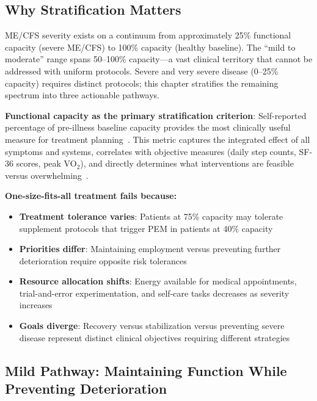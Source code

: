 \subsection{Why Stratification Matters}

ME/CFS severity exists on a continuum from approximately 25\% functional capacity (severe ME/CFS) to 100\% capacity (healthy baseline). The ``mild to moderate'' range spans 50--100\% capacity---a vast clinical territory that cannot be addressed with uniform protocols. Severe and very severe disease (0--25\% capacity) requires distinct protocols; this chapter stratifies the remaining spectrum into three actionable pathways.

\textbf{Functional capacity as the primary stratification criterion}: Self-reported percentage of pre-illness baseline capacity provides the most clinically useful measure for treatment planning~\cite{Carruthers2011ICC}. This metric captures the integrated effect of all symptoms and systems, correlates with objective measures (daily step counts, SF-36 scores, peak VO$_2$), and directly determines what interventions are feasible versus overwhelming~\cite{vanCampen2020severity}.

\textbf{One-size-fits-all treatment fails because:}
\begin{itemize}
    \item \textbf{Treatment tolerance varies}: Patients at 75\% capacity may tolerate supplement protocols that trigger PEM in patients at 40\% capacity
    \item \textbf{Priorities differ}: Maintaining employment versus preventing further deterioration require opposite risk tolerances
    \item \textbf{Resource allocation shifts}: Energy available for medical appointments, trial-and-error experimentation, and self-care tasks decreases as severity increases
    \item \textbf{Goals diverge}: Recovery versus stabilization versus preventing severe disease represent distinct clinical objectives requiring different strategies
\end{itemize}

\subsection{Mild Pathway: Maintaining Function While Preventing Deterioration}
\label{sec:pathway-mild}

